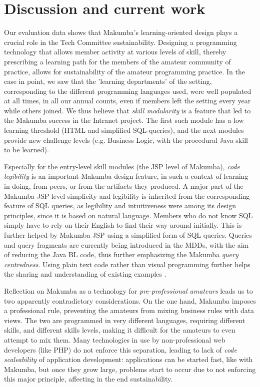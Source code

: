 \documentclass{llncs}
\begin{document}
\section{Discussion and current work}\label{sec:disco}
Our evaluation data shows that Makumba's learning-oriented design  plays a crucial role in the Tech Committee sustainability. Designing a programming technology that allows member activity at various levels of skill, thereby prescribing a learning path for the members of the amateur community of practice, allows for sustainability of the amateur programming practice. In the case in point, we saw that the 'learning departments' of the setting, corresponding to the different programming languages used, were well populated at all times, in all our annual counts,  even if members left the setting every year while others joined. We thus believe that \textit{skill modularity} is a feature that led to the Makumba success in the Intranet project. The first such module has a low learning threshold (HTML and simplified SQL-queries), and the next modules provide new challenge levels (e.g. Business Logic, with the procedural Java skill to be learned).

Especially for the entry-level skill modules (the JSP level of Makumba), \textit{code legibility} is an important Makumba design feature, in such a context of learning in doing, from peers, or from the artifacts they produced. 
A major part of the Makumba JSP level simplicity and legibility is inherited from the corresponding feature of SQL queries, as legibility and intuitiveness were among its design principles, since it is based on natural language. Members who do not know SQL simply have to rely on their English to find their way around initially. This is further helped by Makumba JSP using a simplified form of SQL queries. Queries and query fragments are currently being introduced in the MDDs, with the aim of reducing the Java BL code, thus further emphasizing the Makumba \textit{query centredness}. Using plain text code rather than visual programming further helps the sharing and understanding of existing examples \cite{yamauchi00}. 

Reflection on Makumba as a technology for \textit{pre-professional amateurs} leads us to two apparently contradictory considerations. On the one hand, Makumba imposes a professional rule, preventing the amateurs from mixing business rules with data views.  The two are programmed in very different languages, requiring different skills, and different skills levels, making  it difficult for the amateurs to even attempt to mix them. Many technologies in use by non-professional web developers (like PHP) do not enforce this separation, leading to lack of \textit{code scaleability} of application development: applications can be started fast, like with Makumba, but once they grow large, problems start to occur due to not enforcing this major principle, affecting in the end sustainability.  
\end{document}
